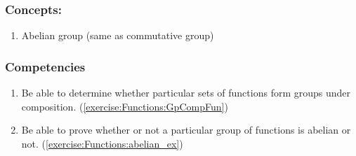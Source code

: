 \subsubsection*{Concepts:}
\begin{enumerate}
\item 
Abelian group (same as commutative group)
\end{enumerate}

\subsubsection*{Competencies}
\begin{enumerate}
\item
Be able to determine whether particular sets of functions form groups under composition. (\ref{exercise:Functions:GpCompFun})
\item
Be able to prove whether or not a particular group of functions is abelian or not. (\ref{exercise:Functions:abelian_ex})
\end{enumerate}
